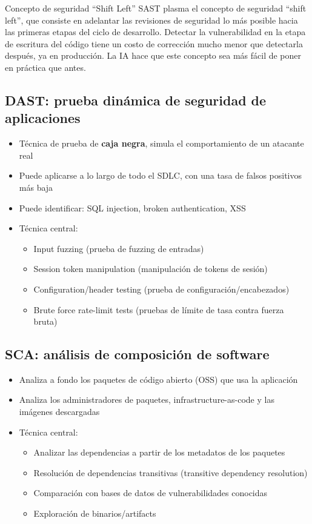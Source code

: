 \documentclass[a4paper]{article}
\begin{document}
\begin{knowledgebox}{Concepto de seguridad ``Shift Left''}
SAST plasma el concepto de seguridad ``shift left'', que consiste en adelantar las revisiones de seguridad lo más posible hacia las primeras etapas del ciclo de desarrollo. Detectar la vulnerabilidad en la etapa de escritura del código tiene un costo de corrección mucho menor que detectarla después, ya en producción. La IA hace que este concepto sea más fácil de poner en práctica que antes.
\end{knowledgebox}

\subsection{DAST: prueba dinámica de seguridad de aplicaciones}

\begin{itemize}
    \item Técnica de prueba de \textbf{caja negra}, simula el comportamiento de un atacante real
    \item Puede aplicarse a lo largo de todo el SDLC, con una tasa de falsos positivos más baja
    \item Puede identificar: SQL injection, broken authentication, XSS
    \item Técnica central:
    \begin{itemize}
        \item Input fuzzing (prueba de fuzzing de entradas)
        \item Session token manipulation (manipulación de tokens de sesión)
        \item Configuration/header testing (prueba de configuración/encabezados)
        \item Brute force rate-limit tests (pruebas de límite de tasa contra fuerza bruta)
    \end{itemize}
\end{itemize}

\subsection{SCA: análisis de composición de software}

\begin{itemize}
    \item Analiza a fondo los paquetes de código abierto (OSS) que usa la aplicación
    \item Analiza los administradores de paquetes, infrastructure-as-code y las imágenes descargadas
    \item Técnica central:
    \begin{itemize}
        \item Analizar las dependencias a partir de los metadatos de los paquetes
        \item Resolución de dependencias transitivas (transitive dependency resolution)
        \item Comparación con bases de datos de vulnerabilidades conocidas
        \item Exploración de binarios/artifacts
    \end{itemize}
\end{itemize}
\end{document}
